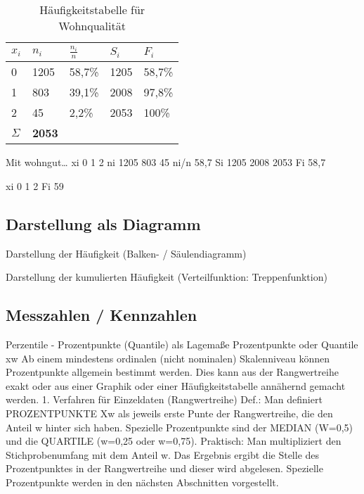 \begin{table}[h]
\caption{Häufigkeitstabelle für Wohnqualität} \label{tab:excel_bsp}
\begin{center}
\begin{tabular}{p{1.25cm}p{1.25cm}p{1.25cm}p{1.25cm}p{1.25cm}}
\hline \hline
\textbf{$x_i$} & \textbf{$n_i$} & \textbf{$\frac{n_i}{n}$} & \textbf{$S_i$} & \textbf{$F_i$}\\ 
\hline
0 & 1205 & 58,7\% & 1205 & 58,7\% \\
1 & 803 & 39,1\% & 2008 & 97,8\% \\
2 & 45 & 2,2\% & 2053 & 100\% \\
\hline
$\Sigma$ & \textbf{2053}
\end{tabular}
\end{center}
\label{default}
\end{table}%


Mit wohngut\ldots
xi	0	1	2
ni	1205	803	45
ni/n	58,7%
Si	1205	2008	2053
Fi	58,7%


xi	0	1	2
Fi	59%


\subsection{Darstellung als Diagramm}
Darstellung der Häufigkeit (Balken- / Säulendiagramm)

Darstellung der kumulierten Häufigkeit (Verteilfunktion: Treppenfunktion)

\subsection{Messzahlen / Kennzahlen}

Perzentile - Prozentpunkte (Quantile) als Lagemaße
Prozentpunkte oder Quantile xw
Ab einem mindestens ordinalen (nicht nominalen) Skalenniveau können
Prozentpunkte allgemein bestimmt werden. Dies kann aus der Rangwertreihe
exakt oder aus einer Graphik oder einer Häufigkeitstabelle annähernd gemacht
werden.
1. Verfahren für Einzeldaten (Rangwertreihe)
Def.: Man definiert PROZENTPUNKTE Xw als jeweils erste Punte der
Rangwertreihe, die den Anteil w hinter sich haben. Spezielle Prozentpunkte
sind der MEDIAN (W=0,5) und die QUARTILE (w=0,25 oder w=0,75).
Praktisch: Man multipliziert den Stichprobenumfang mit dem Anteil w. Das
Ergebnis ergibt die Stelle des Prozentpunktes in der Rangwertreihe und dieser
wird abgelesen. Spezielle Prozentpunkte werden in den nächsten Abschnitten
vorgestellt.

